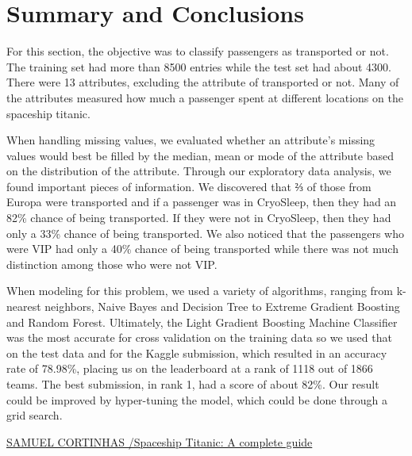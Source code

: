 \documentclass[fleqn,10pt]{SelfArx} %
\begin{document}
\section{Summary and Conclusions}
For this section, the objective was to classify passengers as transported or not. The training set had more than 8500 entries while the test set had about 4300. There were 13 attributes, excluding the attribute of transported or not. Many of the attributes measured how much a passenger spent at different locations on the spaceship titanic. 

When handling missing values, we evaluated whether an attribute’s missing values would best be filled by the median, mean or mode of the attribute based on the distribution of the attribute. Through our exploratory data analysis, we found important pieces of information. We discovered that ⅔ of those from Europa were transported and if a passenger was in CryoSleep, then they had an 82\% chance of being transported. If they were not in CryoSleep, then they had only a 33\% chance of being transported. We also noticed that the passengers who were VIP had only a 40\% chance of being transported while there was not much distinction among those who were not VIP. 

When modeling for this problem, we used a variety of algorithms, ranging from k-nearest neighbors, Naive Bayes and Decision Tree to Extreme Gradient Boosting and Random Forest. Ultimately, the Light Gradient Boosting Machine Classifier was the most accurate for cross validation on the training data so we used that on the test data and for the Kaggle submission, which resulted in an accuracy rate of 78.98\%, placing us on the leaderboard at a rank of 1118 out of 1866 teams. The best submission, in rank 1, had a score of about 82\%. Our result could be improved by hyper-tuning the model, which could be done through a grid search. 


\bigskip
\bigskip
\bigskip    







\href{https://www.kaggle.com/code/samuelcortinhas/spaceship-titanic-a-complete-guide#Libraries}{SAMUEL CORTINHAS /Spaceship Titanic: A complete guide}
\end{document}
